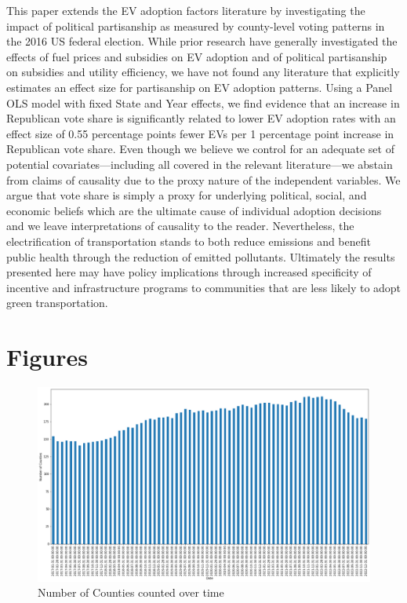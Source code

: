 \documentclass{article}
\begin{document}
This paper extends the EV adoption factors literature by investigating the impact of political partisanship as measured by county-level voting patterns in the 2016 US federal election. While prior research have generally investigated the effects of fuel prices and subsidies on EV adoption and of political partisanship on subsidies and utility efficiency, we have not found any literature that explicitly estimates an effect size for partisanship on EV adoption patterns. 
Using a Panel OLS model with fixed State and Year effects, we find evidence that an increase in Republican vote share is significantly related to lower EV adoption rates with an effect size of 0.55 percentage points fewer EVs per 1 percentage point increase in Republican vote share. Even though we believe we control for an adequate set of potential covariates—including all covered in the relevant literature—we abstain from claims of causality due to the proxy nature of the independent variables. We argue that vote share is simply a proxy for underlying political, social, and economic beliefs which are the ultimate cause of individual adoption decisions and we leave interpretations of causality to the reader.
Nevertheless, the electrification of transportation stands to both reduce emissions and benefit public health through the reduction of emitted pollutants. Ultimately the results presented here may have policy implications through increased specificity of incentive and infrastructure programs to communities that are less likely to adopt green transportation.

\newpage
\section{Figures}

\begin{figure}[!htb]
  \includegraphics[width=\linewidth]{ncounties}
  \caption{Number of Counties counted over time}
\end{figure}
\end{document}
